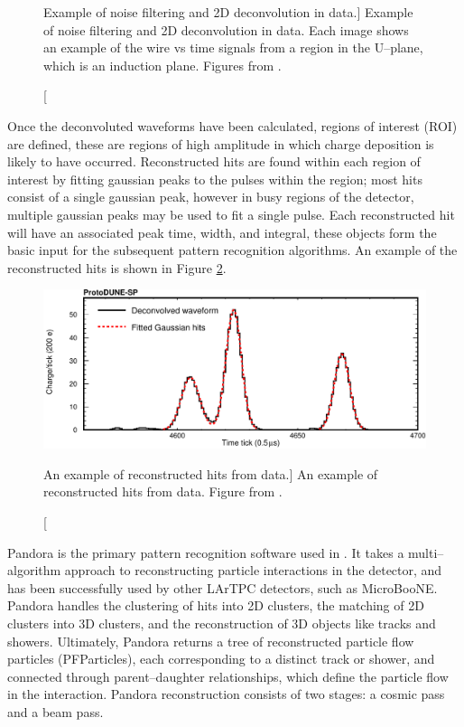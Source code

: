 \begin{figure}
	\caption
	[Example of noise filtering and 2D deconvolution in \protodune{} data.]
	{Example of noise filtering and 2D deconvolution in \protodune{} data. Each
	image shows an example of the wire vs time signals from a region in the
	U--plane, which is an induction plane. Figures from \cite{protoduneperf}.}

	\label{fig:2d_deconv}

\end{figure}

Once the deconvoluted waveforms have been calculated, regions of interest (ROI) 
are defined, these are regions of high amplitude in which charge deposition is
likely to have occurred. Reconstructed hits are found within each region of
interest by fitting gaussian peaks to the pulses within the region; most hits
consist of a single gaussian peak, however in busy regions of the detector,
multiple gaussian peaks may be used to fit a single pulse. Each reconstructed
hit will have an associated peak time, width, and integral, these objects form
the basic input for the subsequent pattern recognition algorithms. An example of
the reconstructed hits is shown in Figure \ref{fig:gaushit}.

\begin{figure}

	\centering

	\includegraphics[width=\textwidth]{figures/gaushit.pdf}

	\caption
	[An example of reconstructed hits from \protodune{} data.]
	{An example of reconstructed hits from \protodune{} data. Figure from 
	\cite{protoduneperf}.}

	\label{fig:gaushit}

\end{figure}

Pandora\cite{Marshall2015} is the primary pattern recognition software used in
\protodune{}. It takes a multi--algorithm approach to reconstructing particle
interactions in the detector, and has been successfully used by other LArTPC
detectors, such as MicroBooNE\cite{Acciarri:2017hat}. Pandora handles the 
clustering of hits into 2D clusters, the matching of 2D clusters into 3D
clusters, and the reconstruction of 3D objects like tracks and 
showers. Ultimately, Pandora returns a tree of reconstructed particle flow
particles (PFParticles), each corresponding to a distinct track or shower, and 
connected through parent--daughter relationships, which define the particle flow
in the interaction. Pandora reconstruction consists of two stages: a cosmic 
pass and a beam pass. 


